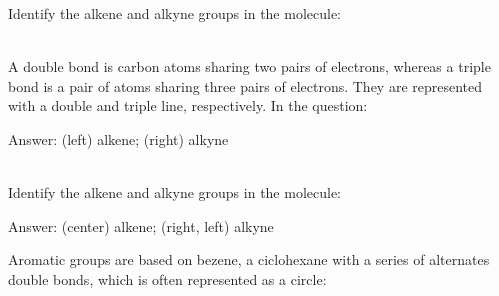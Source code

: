 \documentclass[main.tex]{subfiles}
\newcommand{\mytriangleright}[1]{\tikz{\filldraw[draw=#1,fill=#1] (0,0) --(0em,0.6em) -- (0.4em,0.3em);}}
\begin{document}
\begin{description}
\begin{example} %
Identify the alkene and alkyne groups in the molecule:
\begin{center}\end{center}
\\
A double bond is carbon atoms sharing two pairs of electrons, whereas a triple bond is a pair of atoms sharing three pairs of electrons. They are represented with a double and triple line, respectively. In the question:
\begin{center}\end{center}
\begin{flushright} \mytriangleright{dgreen}\small Answer: (left) alkene; (right) alkyne \end{flushright}
\faDiamond\ \\
Identify the alkene and alkyne groups in the molecule:
\begin{center}\end{center}
\begin{flushright} \mytriangleright{dgreen}\small Answer: (center) alkene; (right, left) alkyne \end{flushright}

\end{example}%



 


  










\item[\docfilehook{  Aromatic group}{Aromatic group}] Aromatic groups are based on bezene, a ciclohexane with a series of alternates double bonds, which is often represented as a circle:


\end{description}
\end{document}
